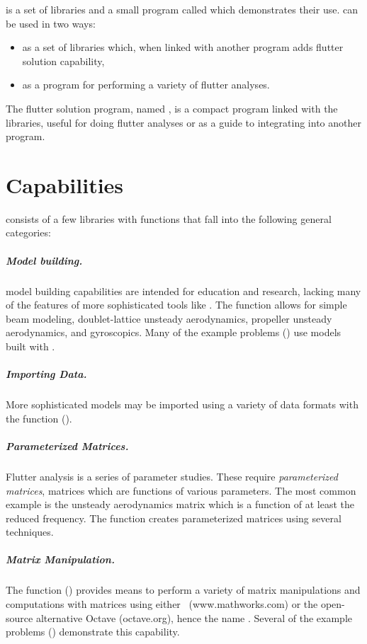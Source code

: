 
\Sfea is a set of libraries and a small program called \Flaps
which demonstrates their use. \Sfea can be used in two ways:
\begin{itemize}
	\item as a set of libraries which, when linked with another program
		adds flutter solution capability,
	\item as a program for performing a variety of flutter analyses.
\end{itemize}
The flutter solution program, named \flaps, is a compact program
linked with the \Flaps libraries, useful for doing flutter analyses or
as a guide to integrating \Flaps into another program.

\section{Capabilities}
\Flaps consists of a few libraries with functions that
fall into the following general categories:

\subparagraph{Model building.}
\Flaps model building capabilities are intended for education
and research, lacking many of the features of more sophisticated
tools like \Nastran.
The  function allows for simple beam modeling,
doublet-lattice unsteady aerodynamics, propeller unsteady
aerodynamics, and gyroscopics. Many of the example problems
() use models built with .

\subparagraph{Importing Data.}
More sophisticated models may be imported using a variety of
data formats with the  function ().
        
\subparagraph{Parameterized Matrices.}
Flutter analysis is a series of parameter studies.
These require \emph{parameterized matrices}, matrices which
are functions of various parameters. The most common example is
the unsteady aerodynamics matrix which is a function of at least
the reduced frequency.
The  function creates parameterized matrices using several
techniques.
        
\subparagraph{Matrix Manipulation.}
The \Flaps {} function () provides means
to perform a variety of matrix manipulations and computations with
\Flaps matrices using either \Matlab\ (www.mathworks.com)
or the open-source alternative Octave (octave.org), hence
the name .
Several of the example problems ()
demonstrate this capability.
        
